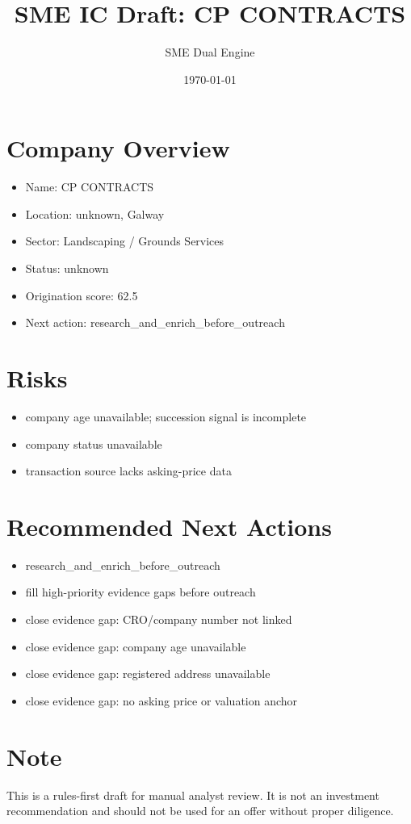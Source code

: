 \documentclass[11pt,a4paper]{article}
\title{SME IC Draft: CP CONTRACTS}
\author{SME Dual Engine}
\date{\today}
\begin{document}
\maketitle
\section*{Company Overview}
\begin{itemize}[leftmargin=1.4em]
\item Name: CP CONTRACTS
\item Location: unknown, Galway
\item Sector: Landscaping / Grounds Services
\item Status: unknown
\item Origination score: 62.5
\item Next action: research\_and\_enrich\_before\_outreach
\end{itemize}
\section*{Risks}
\begin{itemize}[leftmargin=1.4em]
\item company age unavailable; succession signal is incomplete
\item company status unavailable
\item transaction source lacks asking-price data
\end{itemize}
\section*{Recommended Next Actions}
\begin{itemize}[leftmargin=1.4em]
\item research\_and\_enrich\_before\_outreach
\item fill high-priority evidence gaps before outreach
\item close evidence gap: CRO/company number not linked
\item close evidence gap: company age unavailable
\item close evidence gap: registered address unavailable
\item close evidence gap: no asking price or valuation anchor
\end{itemize}
\section*{Note}
This is a rules-first draft for manual analyst review. It is not an investment
recommendation and should not be used for an offer without proper diligence.
\end{document}
